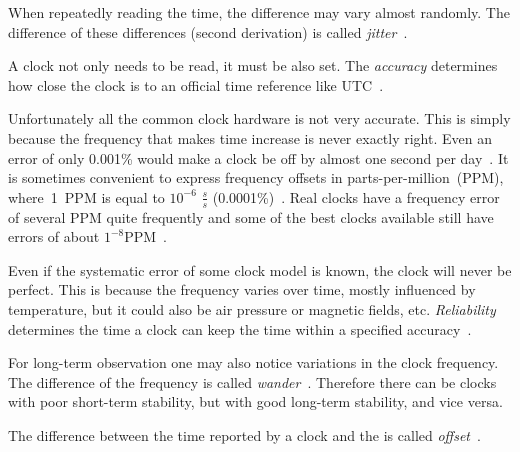 When repeatedly reading the time, the difference may vary almost randomly.
The difference of these differences (second derivation) is called {\it{jitter}}~\cite{ntp-faq}.

A clock not only needs to be read, it must be also set.
The {\it{accuracy}} determines how close the clock is to an official time reference like UTC~\cite{ntp-faq}.

Unfortunately all the common clock hardware is not very accurate.
This is simply because the frequency that makes time increase is never exactly right.
Even an error of only 0.001\% would make a clock be off by almost one second per day~\cite{ntp-faq}.
It is sometimes convenient
to express frequency offsets in parts-per-million~(PPM), where~1~PPM
is equal to $10^{-6}$ $\frac{s}{s}$ (0.0001\%)~\cite{rfc5905}.
Real clocks have a frequency error of several PPM quite frequently
and some of the best clocks available still have errors of about $1^{-8}$PPM~\cite{ntp-faq}.

Even if the systematic error of some clock model is known, the clock will never be perfect.
This is because the frequency varies over time, mostly influenced by temperature,
but it could also be air pressure or magnetic fields, etc.
{\it{Reliability}} determines the time a clock can keep the time within a specified accuracy~\cite{ntp-faq}.

For long-term observation one may also notice variations in the clock frequency.
The difference of the frequency is called {\it{wander}}~\cite{ntp-faq}.
Therefore there can be clocks with poor short-term stability, but with good long-term stability, and vice versa.

The difference between the time reported by a clock and the
is called {\it{offset}}~\cite{thesis-sync}.
